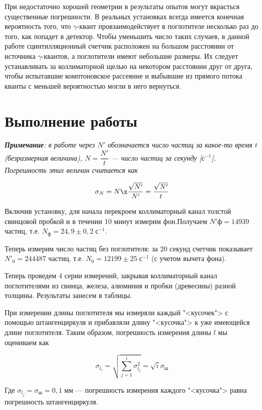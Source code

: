 \documentclass[12pt]{kiarticle}
\newcommand{\ga}{\ensuremath{\gamma}}
\begin{document}
При недостаточно хорошей геометрии в результаты опытов могут
вкрасться существенные погрешности. В реальных установках всегда имеется конечная вероятность того, что \ga-квант провзаимодействует в
поглотителе несколько раз до того, как попадет в детектор. Чтобы уменьшить число таких случаев, в данной работе сцинтилляционный счетчик расположен на большом расстоянии от источника \ga-квантов, а поглотители имеют небольшие
размеры. Их следует устанавливать за коллиматорной щелью на некотором расстоянии друг от друга, чтобы испытавшие комптоновское
рассеяние и выбывшие из прямого потока кванты с меньшей вероятностью могли в него вернуться.

\section{Выполнение работы}

 \textit{\textbf{Примечание}: в работе через $ N' $ обозначается число частиц за какое-то время $ t $ (безразмерная величина), $ N = \dfrac{N'}{t} $ --- число частиц за секунду [с$ ^{-1} $]. Погрешность этих величин считается как} 
 
 \begin{equation}\label{}
 \sigma_N = N \x \dfrac{\sqrt{N'}}{N'} = \dfrac{\sqrt{N'}}{t}
 \end{equation}

Включив установку, для начала перекроем коллиматорный канал толстой свинцовой пробкой и в течении 10 минут измерим фон.Получаем $ N'ф = 14939 $ частиц, т.е. $ N_ф = 24,9 \pm 0,2 \; с^{-1} $.

Теперь измерим число частиц без поглотителя: за 20 секунд счетчик показывает $ N'_0 = 244487 $ частиц, т.е. $ N_0 = 12199 \pm 25 \; с^{-1}$ (с учетом вычета фона). 

Теперь проведем 4 серии измерений, закрывая коллиматорный канал поглотителями из свинца, железа, алюминия и пробки (древесины) разной толщины. Результаты занесем в таблицы. 

При измерении длины поглотителя мы измеряли каждый "<кусочек"> с помощью штангенциркуля и прибавляли длину "<кусочка"> к уже имеющейся длине поглотителя. Таким образом,  погрешность измерения длины $ l $ мы оцениваем как

\begin{equation}\label{}
\sigma_{l_i} = \sqrt{\sum\limits_{j=1}^i \sigma_{l_j}^2} = \sqrt{i}\sigma_ш
\end{equation}

Где $ \sigma_{l_j} = \sigma_ш = 0,1 \;мм $ --- погрешность измерения каждого "<кусочка"> равна погрешность штангенциркуля. 
\end{document}
